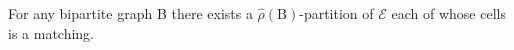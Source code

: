 For any bipartite graph B there exists a $\hat{\rho}(\text{B})$-partition of $\mathcal{E}$ each of whose cells is a matching.
